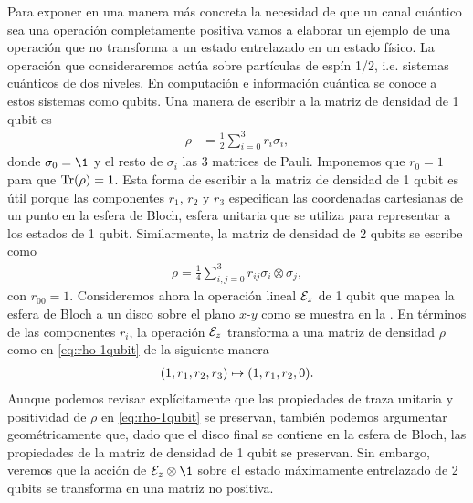 Para exponer en una manera más concreta la necesidad de 
que un canal cuántico sea una operación completamente 
positiva vamos a elaborar un ejemplo de una operación 
que no transforma a un estado entrelazado en 
un estado físico. La operación que consideraremos 
actúa sobre partículas de espín 1/2, i.e. sistemas cuánticos de
dos niveles. En computación e información cuántica
se conoce a estos sistemas como qubits. Una manera
de escribir a la matriz de densidad de 1 qubit es
\begin{align}
\rho&=\frac{1}{2}\sum_{i=0}^{3} r_i\sigma_i,
\label{eq:rho-1qubit}
\end{align}
donde $\sigma_0=\1$ y el resto de $\sigma_i$ las 3 matrices de Pauli.
Imponemos que $r_0=1$ para que $\Tr(\rho)=1$.
Esta forma de escribir a la matriz de densidad de 1 qubit es útil porque
las componentes $r_1$, $r_2$ y $r_3$ especifican las coordenadas 
cartesianas de un punto en la esfera de Bloch, esfera unitaria que 
se utiliza para representar a los estados de 1 qubit. Similarmente, 
la matriz de densidad de 2 qubits se escribe como~\cite{nielsen_chuang_2011}
\begin{align}\label{eq:rho-2qubits}
\rho=\frac{1}{4}\sum _{i,j=0}^{3}r_{ij}\sigma_i\otimes\sigma_j,
\end{align}
con $r_{00}=1$.
Consideremos ahora la operación lineal $\mathcal{E}_z$ de 1 qubit
que mapea la esfera de Bloch a un disco sobre el plano $x$-$y$ 
como se muestra en la . 
En términos de las componentes $r_i$, la operación $\mathcal{E}_z$ 
transforma a una matriz de densidad $\rho$ como en 
\eqref{eq:rho-1qubit} de la siguiente manera
\begin{align}
\qty(1,r_1,r_2,r_3)\mapsto\qty(1,r_1,r_2,0).
\end{align}
Aunque podemos revisar explícitamente que las propiedades 
de traza unitaria y positividad de $\rho$ en \eqref{eq:rho-1qubit}
se preservan, también podemos argumentar geométricamente
que, dado que el disco final se contiene en la esfera de Bloch, 
las propiedades de la matriz de densidad de 1 qubit se preservan.
Sin embargo, veremos que la acción de $\E_z\ot \1$ 
sobre el estado máximamente entrelazado de 2 qubits 
se transforma en una matriz no positiva.

